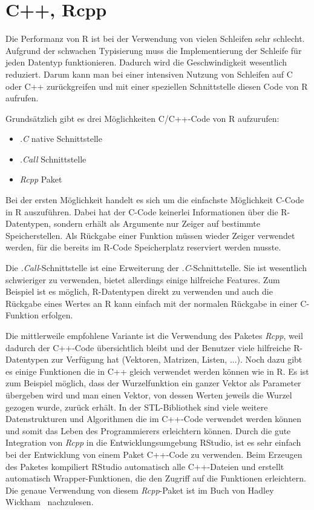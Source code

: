 \section{C++, Rcpp}
\label{sec:Rcpp}
Die Performanz von R ist bei der Verwendung von vielen Schleifen sehr schlecht. Aufgrund der schwachen Typisierung muss die Implementierung der Schleife für jeden Datentyp funktionieren. Dadurch wird die Geschwindigkeit wesentlich reduziert. Darum kann man bei einer intensiven Nutzung von Schleifen auf C oder C++ zurückgreifen und mit einer speziellen Schnittstelle diesen Code von R aufrufen.

Grundsätzlich gibt es drei Möglichkeiten C/C++-Code von R aufzurufen:
\begin{itemize}
	\item \emph{.C} native Schnittstelle
	\item \emph{.Call} Schnittstelle
	\item \emph{Rcpp} Paket
\end{itemize}

Bei der ersten Möglichkeit handelt es sich um die einfachste Möglichkeit C-Code in R auszuführen. Dabei hat der C-Code keinerlei Informationen über die R-Datentypen, sondern erhält als Argumente nur Zeiger auf bestimmte Speicherstellen. Als Rückgabe einer Funktion müssen wieder Zeiger verwendet werden, für die bereits im R-Code Speicherplatz reserviert werden musste.

Die \emph{.Call}-Schnittstelle ist eine Erweiterung der \emph{.C}-Schnittstelle. Sie ist wesentlich schwieriger zu verwenden, bietet allerdings einige hilfreiche Features. Zum Beispiel ist es möglich, R-Datentypen direkt zu verwenden und auch die Rückgabe eines Wertes an R kann einfach mit der normalen Rückgabe in einer C-Funktion erfolgen.~\cite[171-187]{wickham2015r}

Die mittlerweile empfohlene Variante ist die Verwendung des Paketes \emph{Rcpp}, weil dadurch der C++-Code übersichtlich bleibt und der Benutzer viele hilfreiche R-Datentypen zur Verfügung hat (Vektoren, Matrizen, Listen, ...). Noch dazu gibt es einige Funktionen die in C++ gleich verwendet werden können wie in R. Es ist zum Beispiel möglich, dass der Wurzelfunktion ein ganzer Vektor als Parameter übergeben wird und man einen Vektor, von dessen Werten jeweils die Wurzel gezogen wurde, zurück erhält. In der STL-Bibliothek sind viele weitere Datenstrukturen und Algorithmen die im C++-Code verwendet werden können und somit das Leben des Programmierers erleichtern können. Durch die gute Integration von \emph{Rcpp} in die Entwicklungsumgebung RStudio, ist es sehr einfach bei der Entwicklung von einem Paket C++-Code zu verwenden. Beim Erzeugen des Paketes kompiliert RStudio automatisch alle C++-Dateien und erstellt automatisch Wrapper-Funktionen, die den Zugriff auf die Funktionen erleichtern. Die genaue Verwendung von diesem \emph{Rcpp}-Paket ist im Buch von Hadley Wickham~\cite[395-430]{wickham2015advanced} nachzulesen.


